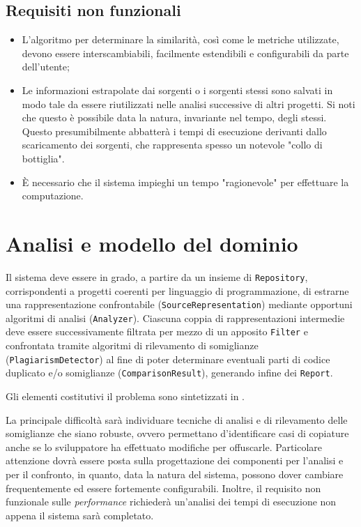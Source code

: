 \subsection*{Requisiti non funzionali}
\begin{itemize}
    \item L'algoritmo per determinare la similarità, così come le metriche utilizzate, devono essere interscambiabili, facilmente estendibili e configurabili da parte dell'utente;

    \item Le informazioni estrapolate dai sorgenti o i sorgenti stessi sono salvati in modo tale da essere riutilizzati nelle analisi successive di altri progetti. 
    Si noti che questo è possibile data la natura, invariante nel tempo, degli stessi.
    Questo presumibilmente abbatterà i tempi di esecuzione derivanti dallo scaricamento dei sorgenti, che rappresenta spesso un notevole "collo di bottiglia".

    \item \`E necessario che il sistema impieghi un tempo "ragionevole" per effettuare la computazione.
\end{itemize}

\section{Analisi e modello del dominio}
Il sistema deve essere in grado, a partire da un insieme di \texttt{Repository}, corrispondenti a progetti coerenti per linguaggio di programmazione, di estrarne una rappresentazione confrontabile (\texttt{SourceRepresentation}) mediante opportuni algoritmi di analisi (\texttt{Analyzer}).
%
Ciascuna coppia di rappresentazioni intermedie deve essere successivamente filtrata per mezzo di un apposito \texttt{Filter} e confrontata tramite algoritmi di rilevamento di somiglianze (\texttt{PlagiarismDetector}) al fine di poter determinare eventuali parti di codice duplicato e/o somiglianze (\texttt{ComparisonResult}), generando infine dei \texttt{Report}.

Gli elementi costitutivi il problema sono sintetizzati in .

La principale difficoltà sarà individuare tecniche di analisi e di rilevamento delle somiglianze che siano robuste, ovvero permettano d'identificare casi di copiature anche se lo sviluppatore ha effettuato modifiche per offuscarle.
%
Particolare attenzione dovrà essere posta sulla progettazione dei componenti per l'analisi e per il confronto, in quanto, data la natura del sistema, possono dover cambiare frequentemente ed essere fortemente configurabili.
%
Inoltre, il requisito non funzionale sulle \textit{performance} richiederà un'analisi dei tempi di esecuzione non appena il sistema sarà completato.

